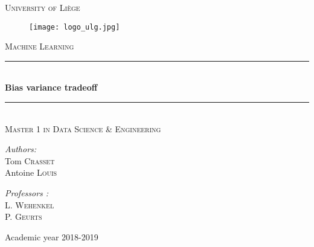 \documentclass{article}
\newcommand{\HRule}{\rule{\linewidth}{0.5mm}}
\begin{document}
 
\begin{titlepage}


  \begin{sffamily}
  \begin{center}

   
    \textsc{\Large University of Liège}\\[0.8cm]
    
    \begin{figure}[h!]
		\begin{center}
		\texttt{[image: logo\_ulg.jpg]}\\[1cm]
		\end{center}
	\end{figure}
	

    \textsc{\Large Machine Learning}\\[1.1cm]

    
    \HRule \\[0.4cm]
    { \LARGE \bfseries Bias variance tradeoff\\[0.4cm] }

    \HRule \\[0.5cm]
    
    \textsc{Master 1 in Data Science \& Engineering} \\[2.5cm]

   \begin{minipage}{0.4\textwidth}
      \begin{flushleft} \large
        \emph{Authors:}\\
        Tom \textsc{Crasset}\\
        Antoine \textsc{Louis} 
      \end{flushleft}
    \end{minipage}
    \begin{minipage}{0.4\textwidth}
      \begin{flushright} \large
        \emph{Professors :}\\
        L. \textsc{Wehenkel}\\
        P. \textsc{Geurts}\\

      \end{flushright}
    \end{minipage}
    


    \vfill

    
    {\large Academic year 2018-2019}

  \end{center}
  \end{sffamily}
\end{titlepage}
\end{document}
